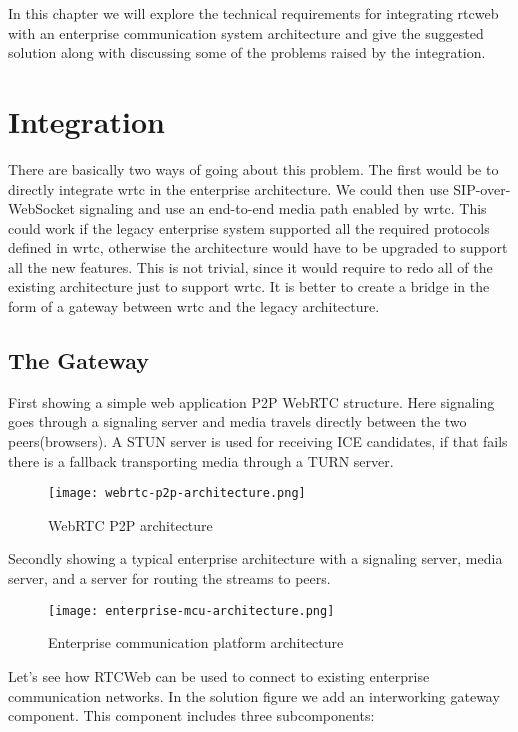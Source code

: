 In this chapter we will explore the technical requirements for integrating \gls{rtcweb} with an enterprise communication system architecture and give the suggested solution along with discussing some of the problems raised by the integration.

\section{Integration}
There are basically two ways of going about this problem. The first would be to directly integrate \gls{wrtc} in the enterprise architecture. We could then use SIP-over-WebSocket signaling and use an end-to-end media path enabled by \gls{wrtc}. This could work if the legacy enterprise system supported all the required protocols defined in \gls{wrtc}, otherwise the architecture would have to be upgraded to support all the new features. This is not trivial, since it would require to redo all of the existing architecture just to support \gls{wrtc}. It is better to create a bridge in the form of a gateway between \gls{wrtc} and the legacy architecture.

\subsection{The Gateway}
First showing a simple web application P2P WebRTC structure. Here signaling goes through a signaling server and media travels directly between the two peers(browsers). A STUN server is used for receiving ICE candidates, if that fails there is a fallback transporting media through a TURN server.
\\
\begin{figure}[here]
\centerline{\texttt{[image: webrtc-p2p-architecture.png]}}
\caption{WebRTC P2P architecture}
\label{fig:jsep}
\end{figure}

Secondly showing a typical enterprise architecture with a signaling server, media server, and a server for routing the streams to peers.
\\
\begin{figure}[here]
\centerline{\texttt{[image: enterprise-mcu-architecture.png]}}
\caption{Enterprise communication platform architecture}
\label{fig:VirtualArenaArchitecture}
\end{figure}

Let's see how RTCWeb can be used to connect to existing enterprise communication networks. In the solution figure we add an interworking gateway component. This component includes three subcomponents:

